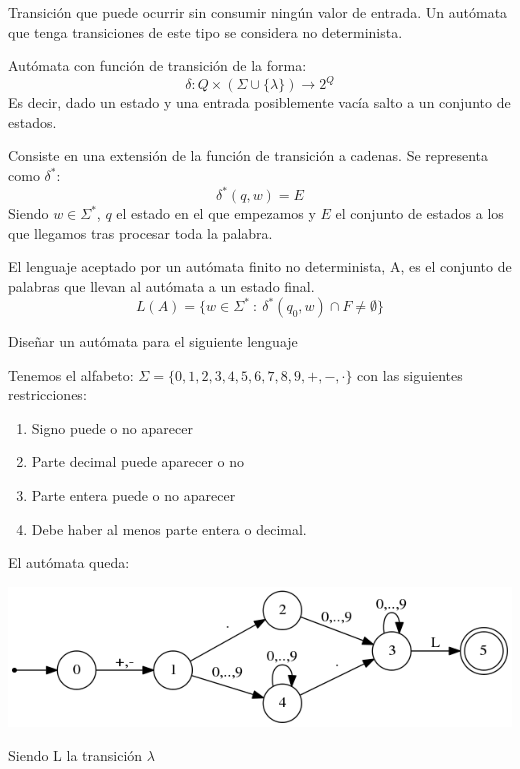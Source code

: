 \documentclass{apuntes}
\begin{document}
\begin{defn}
Transición que puede ocurrir sin consumir ningún valor de entrada. Un autómata que tenga transiciones de este tipo se considera no determinista.
\end{defn}

\begin{defn}
Autómata con función de transición de la forma:
\[\delta: Q\times (\Sigma \cup \lbrace \lambda \rbrace) \rightarrow 2^Q\]
Es decir, dado un estado y una entrada posiblemente vacía salto a un conjunto de estados.
\end{defn}

\begin{defn}
Consiste en una extensión de la función de transición a cadenas. Se representa como $\delta ^*$:
\[\delta^*(q, w) = E\]
Siendo $w\in \Sigma ^*$, $q$ el estado en el que empezamos y $E$ el conjunto de estados a los que llegamos tras procesar toda la palabra.
\end{defn}

\newpage

\begin{defn}
El lenguaje aceptado por un autómata finito no determinista, A, es el conjunto de palabras que llevan al autómata a un estado final.
\[L(A) = \lbrace w \in \Sigma^* \ : \ \delta^*(q_0, w)\cap F \neq \emptyset \rbrace\]
\end{defn}

\begin{example}
Diseñar un autómata para el siguiente lenguaje

Tenemos el alfabeto: $\Sigma = \lbrace 0,1,2,3,4,5,6,7,8,9,+,-,\cdot \rbrace$ con las siguientes restricciones:
\begin{enumerate}
\item Signo puede o no aparecer
\item Parte decimal puede aparecer o no
\item Parte entera puede o no aparecer
\item Debe haber al menos parte entera o decimal.
\end{enumerate}

El autómata queda:
\begin{center}
\includegraphics[scale=0.75]{automata4.png}
\end{center}
Siendo L la transición $\lambda$
\end{example}
\end{document}
